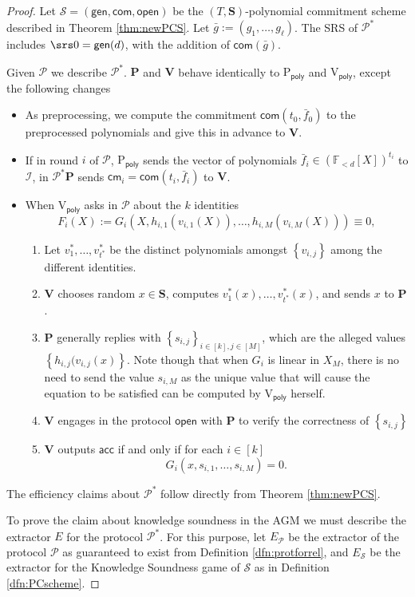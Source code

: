 \documentclass[11pt]{article} %
\newcommand{\F}{\ensuremath{\mathbb F}\xspace}
\newcommand{\com}{\ensuremath{\mathsf{com}}\xspace}
\newcommand{\cm}{\ensuremath{\mathsf{cm}}\xspace}
\newcommand{\open}{\ensuremath{\mathsf{open}}\xspace}
\newcommand{\acc}{\ensuremath{\mathsf{acc}}\xspace}
\newcommand{\defeq}{:=}
\newcommand{\sett}[2]{\ensuremath{\set{#1}_{#2}}\xspace}
\newcommand{\gen}{\ensuremath{\mathsf{gen}}\xspace}
\newcommand{\prv}{\ensuremath{\mathsf{\mathbf{P}}}\xspace}
\newcommand{\prvpoly}{\ensuremath{\mathrm{P_{\mathsf{poly}}}}\xspace}
\newcommand{\verpoly}{\ensuremath{\mathrm{V_{\mathsf{poly}}}}\xspace}
\newcommand{\ideal}{\ensuremath{\mathcal{I}}\xspace}
\newcommand{\ver}{\ensuremath{\mathsf{\mathbf{V}}}\xspace}
\newcommand{\ext}{\ensuremath{E}\xspace}
\newcommand{\set}[1]{\ensuremath{\left\{#1\right\}}\xspace}
\newcommand{\polyvecs}[2]{\ensuremath{(\F_{< #1}[X])^{#2}}\xspace}
\newcommand{\prot}{\ensuremath{\mathscr{P}}\xspace}
\newcommand{\PCscheme}{\ensuremath{\mathscr{S}}\xspace}
\newcommand{\protprime}{\ensuremath{\mathscr{P^*}}\xspace}
\newcommand{\extprot}{\ensuremath{E_{\prot}}\xspace}
\newcommand{\extpc}{\ensuremath{E_{\PCscheme}}\xspace}
\newcommand{\openset}{\ensuremath{\mathbf{S}}\xspace}
\newcommand{\f}{\ensuremath{\bar{f}}\xspace}
\renewcommand{\g}{\ensuremath{\bar{g}}\xspace}
\begin{document}
\begin{proof}
Let $\PCscheme=(\gen,\com,\open)$ be the $(T,\openset)$-polynomial commitment scheme described in Theorem \ref{thm:newPCS}.
Let $\g \defeq (g_1,\ldots,g_\ell)$. The SRS of \protprime includes $\srs0=\gen(d)$,
with the addition of $\com(\g)$.

Given \prot we describe \protprime.
\prv and \ver behave identically to \prvpoly and \verpoly,
except the following changes
\begin{itemize}
\item As preprocessing, we compute the commitment $\com(t_0,\f_0)$ to the preprocessed polynomials and give this in advance to \ver.
 \item If in round $i$ of \prot, \prvpoly sends the vector of polynomials $\f_i\in \polyvecs{d}{t_i}$ to \ideal, in \protprime \prv sends $\cm_i = \com(t_i,\f_i)$ to  \ver.
\item When \verpoly asks in \prot about the $k$ identities 
  \[F_i(X)\defeq G_i(X, h_{i,1}(v_{i,1}(X)),\ldots,h_{i,M}(v_{i,M}(X)))\equiv 0,\]
  \begin{enumerate}
 \item Let $v^*_1,\ldots,v^*_{t^*}$ be the distinct polynomials amongst $\set{v_{i,j}}$ among the different identities.
 \item \ver chooses random $x\in\openset $, computes $v^*_1(x),\ldots,v^*_{t^*}(x)$, and sends $x$ to \prv. 
 \item \prv generally replies with \sett{s_{i,j}}{i\in [k], j\in [M]}, which are the alleged values \set{h_{i,j}(v_{i,j}(x)}. Note though that when $G_i$ is linear in $X_M$, there is no need to send the value $s_{i,M}$ as the unique value that will cause the equation to be satisfied can be computed by \verpoly herself.

\item\label{step:open} \ver engages in the protocol \open with \prv to verify the correctness of \set{s_{i,j}}
\item \ver outputs \acc if and only if for each $i\in [k]$ 
  \[G_i(x,s_{i,1},\ldots,s_{i,M})= 0.\]

  \end{enumerate}


\end{itemize}

The efficiency claims about \protprime follow directly from Theorem \ref{thm:newPCS}.


To prove the claim about knowledge soundness in the AGM we must describe the extractor \ext for the protocol \protprime.
For this purpose, let \extprot be the extractor of the protocol \prot as guaranteed to exist from Definition \ref{dfn:protforrel}, and \extpc be the extractor for the Knowledge Soundness game of \PCscheme as in Definition \ref{dfn:PCscheme}.



\end{proof}
\end{document}
